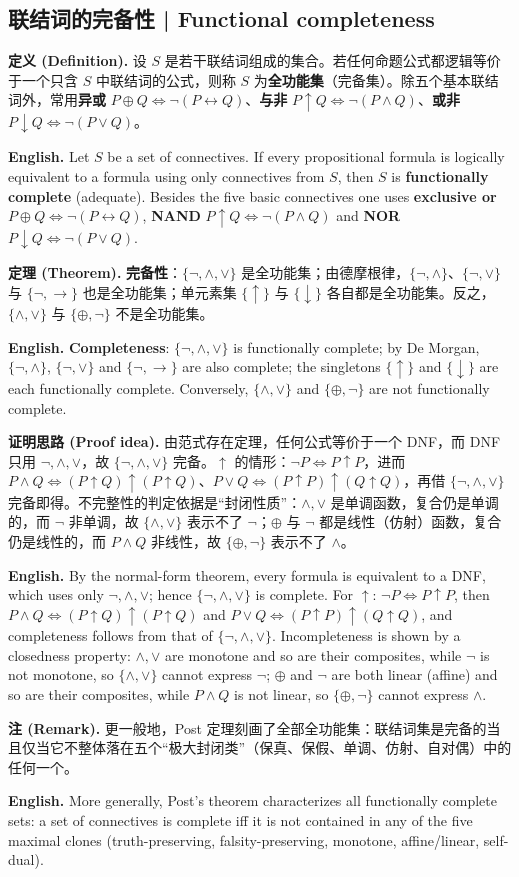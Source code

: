 \documentclass[UTF8,11pt,a4paper]{ctexart}
\newcommand{\EN}[1]{\par\noindent \textbf{English.} #1\par}
\newcommand{\DEF}[2]{\par\noindent\textbf{定义 (Definition).} #1\par\EN{#2}}
\newcommand{\THM}[2]{\par\noindent\textbf{定理 (Theorem).} #1\par\EN{#2}}
\newcommand{\PRF}[2]{\par\noindent\textbf{证明思路 (Proof idea).} #1\par\EN{#2}}
\newcommand{\REM}[2]{\par\noindent\textbf{注 (Remark).} #1\par\EN{#2}}
\begin{document}
\subsection{联结词的完备性 | Functional completeness}
\DEF{设 $S$ 是若干联结词组成的集合。若任何命题公式都逻辑等价于一个只含 $S$ 中联结词的公式，则称 $S$ 为\textbf{全功能集}（完备集）。除五个基本联结词外，常用\textbf{异或} $P\oplus Q\Leftrightarrow\neg(P\leftrightarrow Q)$、\textbf{与非} $P\uparrow Q\Leftrightarrow\neg(P\wedge Q)$、\textbf{或非} $P\downarrow Q\Leftrightarrow\neg(P\vee Q)$。}{Let $S$ be a set of connectives. If every propositional formula is logically equivalent to a formula using only connectives from $S$, then $S$ is \textbf{functionally complete} (adequate). Besides the five basic connectives one uses \textbf{exclusive or} $P\oplus Q\Leftrightarrow\neg(P\leftrightarrow Q)$, \textbf{NAND} $P\uparrow Q\Leftrightarrow\neg(P\wedge Q)$ and \textbf{NOR} $P\downarrow Q\Leftrightarrow\neg(P\vee Q)$.}
\THM{\textbf{完备性}：$\{\neg,\wedge,\vee\}$ 是全功能集；由德摩根律，$\{\neg,\wedge\}$、$\{\neg,\vee\}$ 与 $\{\neg,\to\}$ 也是全功能集；单元素集 $\{\uparrow\}$ 与 $\{\downarrow\}$ 各自都是全功能集。反之，$\{\wedge,\vee\}$ 与 $\{\oplus,\neg\}$ 不是全功能集。}{\textbf{Completeness}: $\{\neg,\wedge,\vee\}$ is functionally complete; by De Morgan, $\{\neg,\wedge\}$, $\{\neg,\vee\}$ and $\{\neg,\to\}$ are also complete; the singletons $\{\uparrow\}$ and $\{\downarrow\}$ are each functionally complete. Conversely, $\{\wedge,\vee\}$ and $\{\oplus,\neg\}$ are not functionally complete.}
\PRF{由范式存在定理，任何公式等价于一个 DNF，而 DNF 只用 $\neg,\wedge,\vee$，故 $\{\neg,\wedge,\vee\}$ 完备。$\uparrow$ 的情形：$\neg P\Leftrightarrow P\uparrow P$，进而 $P\wedge Q\Leftrightarrow(P\uparrow Q)\uparrow(P\uparrow Q)$、$P\vee Q\Leftrightarrow(P\uparrow P)\uparrow(Q\uparrow Q)$，再借 $\{\neg,\wedge,\vee\}$ 完备即得。不完整性的判定依据是“封闭性质”：$\wedge,\vee$ 是单调函数，复合仍是单调的，而 $\neg$ 非单调，故 $\{\wedge,\vee\}$ 表示不了 $\neg$；$\oplus$ 与 $\neg$ 都是线性（仿射）函数，复合仍是线性的，而 $P\wedge Q$ 非线性，故 $\{\oplus,\neg\}$ 表示不了 $\wedge$。}{By the normal-form theorem, every formula is equivalent to a DNF, which uses only $\neg,\wedge,\vee$; hence $\{\neg,\wedge,\vee\}$ is complete. For $\uparrow$: $\neg P\Leftrightarrow P\uparrow P$, then $P\wedge Q\Leftrightarrow(P\uparrow Q)\uparrow(P\uparrow Q)$ and $P\vee Q\Leftrightarrow(P\uparrow P)\uparrow(Q\uparrow Q)$, and completeness follows from that of $\{\neg,\wedge,\vee\}$. Incompleteness is shown by a closedness property: $\wedge,\vee$ are monotone and so are their composites, while $\neg$ is not monotone, so $\{\wedge,\vee\}$ cannot express $\neg$; $\oplus$ and $\neg$ are both linear (affine) and so are their composites, while $P\wedge Q$ is not linear, so $\{\oplus,\neg\}$ cannot express $\wedge$.}
\REM{更一般地，Post 定理刻画了全部全功能集：联结词集是完备的当且仅当它不整体落在五个“极大封闭类”（保真、保假、单调、仿射、自对偶）中的任何一个。}{More generally, Post's theorem characterizes all functionally complete sets: a set of connectives is complete iff it is not contained in any of the five maximal clones (truth-preserving, falsity-preserving, monotone, affine/linear, self-dual).}
\end{document}
